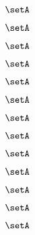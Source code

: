 \begin{forslides}
    \begin{equation}
        \label{eq:slides-processes-87}
        \setA
    \end{equation}

    \begin{equation}
        \label{eq:slides-processes-88}
        \setA
    \end{equation}

    \begin{equation}
        \label{eq:slides-processes-89}
        \setA
    \end{equation}
    
    \begin{equation}
        \label{eq:slides-processes-90}
        \setA
    \end{equation}

    \begin{equation}
        \label{eq:slides-processes-91}
        \setA
    \end{equation}

    \begin{equation}
        \label{eq:slides-processes-92}
        \setA
    \end{equation}

    \begin{equation}
        \label{eq:slides-processes-93}
        \setA
    \end{equation}

    \begin{equation}
        \label{eq:slides-processes-94}
        \setA
    \end{equation}

    \begin{equation}
        \label{eq:slides-processes-95}
        \setA
    \end{equation}

    \begin{equation}
        \label{eq:slides-processes-96}
        \setA
    \end{equation}

    \begin{equation}
        \label{eq:slides-processes-97}
        \setA
    \end{equation}

    \begin{equation}
        \label{eq:slides-processes-98}
        \setA
    \end{equation}

    \begin{equation}
        \label{eq:slides-processes-99}
        \setA
    \end{equation}
    

\end{forslides}

